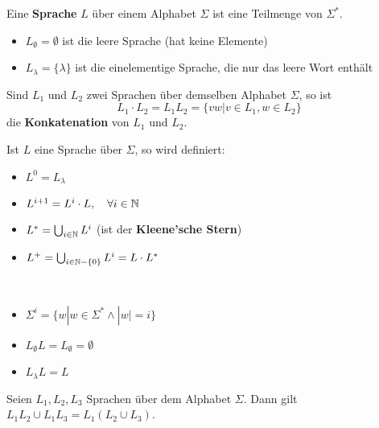 \begin{definition}
Eine \textbf{Sprache} $L$ über einem Alphabet $\Sigma$ ist eine Teilmenge von $\Sigma^*$.\\
\end{definition}

\begin{itemize}
  \item $L_\emptyset = \emptyset$ ist die leere Sprache (hat keine Elemente)
  \item $L_\lambda = \{\lambda\}$ ist die einelementige Sprache, die nur das leere Wort enthält\\
\end{itemize}

\begin{definition}
Sind $L_1$ und $L_2$ zwei Sprachen über demselben Alphabet $\Sigma$, so ist
\[
L_1 \cdot L_2 = L_1 L_2 = \{vw | v \in L_1, w \in L_2\}
\]
die \textbf{Konkatenation} von $L_1$ und $L_2$.\\
\end{definition}

\begin{definition}
Ist $L$ eine Sprache über $\Sigma$, so wird definiert:
\begin{itemize}
  \item $L^0 = L_\lambda$
  \item $L^{i+1} = L^i \cdot L, \quad \forall i \in \mathbb{N}$
  \item $L^* = \bigcup_{i \in \mathbb{N}} L^i$ (ist der \textbf{Kleene'sche Stern})
  \item $L^+ = \bigcup_{i \in \mathbb{N} - \{0\}} L^i = L \cdot L^*$\\
\end{itemize}
\end{definition}

\begin{remark}
\
\begin{itemize}
  \item $\Sigma^i = \{w | w \in \Sigma^* \land |w| = i\}$
  \item $L_\emptyset L = L_\emptyset = \emptyset$
  \item $L_\lambda L = L$\\
\end{itemize}

\end{remark}

\begin{lemma}
Seien $L_1, L_2, L_3$ Sprachen über dem Alphabet $\Sigma$. Dann gilt $L_1 L_2 \cup L_1 L_3 = L_1 (L_2 \cup L_3)$.\\
\end{lemma}

